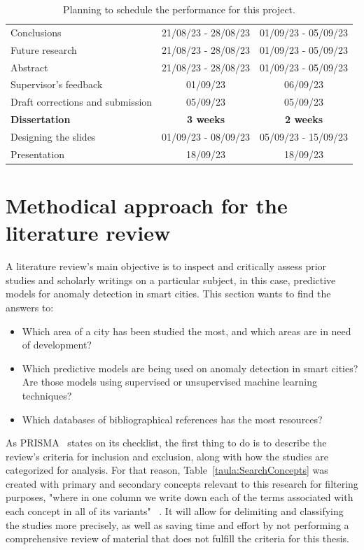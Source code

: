 \documentclass[a4paper,12pt,twoside]{ThesisStyle}
\begin{document}
\begin{table}[]
\begin{tabular}{lcc}
Conclusions & 21/08/23 - 28/08/23 & 01/09/23 - 05/09/23 \\
Future research & 21/08/23 - 28/08/23 & 01/09/23 - 05/09/23 \\
Abstract & 21/08/23 - 28/08/23 & 01/09/23 - 05/09/23\\
Supervisor's feedback & 01/09/23 & 06/09/23 \\
\parbox{4cm}{Draft corrections and submission} & 05/09/23 & 05/09/23 \\
\textbf{Dissertation} & \textbf{3 weeks} & \textbf{2 weeks}\\
Designing the slides & 01/09/23 - 08/09/23 & 05/09/23 - 15/09/23\\
Presentation & 18/09/23 & 18/09/23                                         
\end{tabular}
\caption{Planning to schedule the performance for this project.}
\label{taula:planning} 
\end{table}

\section{Methodical approach for the literature review}
A literature review's main objective is to inspect and critically assess prior studies and scholarly writings on a particular subject, in this case, predictive models for anomaly detection in smart cities. This section wants to find the answers to:

\begin{itemize}
  \item Which area of a city has been studied the most, and which areas are in need of development?
  \item Which predictive models are being used on anomaly detection in smart cities? Are those models using supervised or unsupervised machine learning techniques?
  \item Which databases of bibliographical references has the most resources?
\end{itemize}

As PRISMA~\cite{PRISMA2020} states on its checklist, the first thing to do is to describe the review's criteria for inclusion and exclusion, along with how the studies are categorized for analysis. For that reason, Table~\ref{taula:SearchConcepts} was created with primary and secondary concepts relevant to this research for filtering purposes, "where in one column we write down each of the terms associated with each concept in all of its variants" ~\cite{SearchStrategy2018}. It will allow for delimiting and classifying the studies more precisely, as well as saving time and effort by not performing a comprehensive review of material that does not fulfill the criteria for this thesis.
\end{document}
